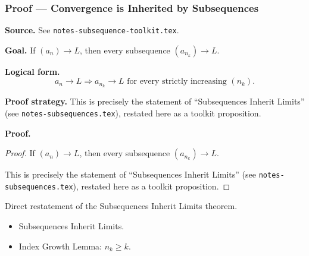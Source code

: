 
\clearpage
{}
\hypertarget{proof-RA-ABB-P-conv-inherited}{}

\subsubsection[Convergence is Inherited by Subsequences]{Proof --- Convergence is Inherited by Subsequences}

\bigskip

\noindent
\textbf{Source.}
See \texttt{notes-subsequence-toolkit.tex}.

\vspace{0.75em}

\noindent
\textbf{Goal.}
If $(a_n) \to L$, then every subsequence $(a_{n_k}) \to L$.

\vspace{0.75em}

\noindent
\textbf{Logical form.}
\[
  a_n \to L \Rightarrow a_{n_k} \to L \text{ for every strictly increasing } (n_k).
\]

\vspace{0.75em}

\noindent
\textbf{Proof strategy.}
This is precisely the statement of ``Subsequences Inherit Limits'' (see \texttt{notes-subsequences.tex}), restated here as a toolkit proposition.

\vspace{0.75em}

\noindent
\textbf{Proof.}
\begin{proof}
\Claim If $(a_n) \to L$, then every subsequence $(a_{n_k}) \to L$.

\Given 

\Goal 

\Strategy This is precisely the statement of ``Subsequences Inherit Limits'' (see \texttt{notes-subsequences.tex}), restated here as a toolkit proposition.

\medskip


\end{proof}

\begin{remark*}
Direct restatement of the Subsequences Inherit Limits theorem.
\end{remark*}

\begin{remark*}[Dependencies]
\begin{itemize}
  \item Subsequences Inherit Limits.
  \item Index Growth Lemma: $n_k \ge k$.
\end{itemize}
\end{remark*}
